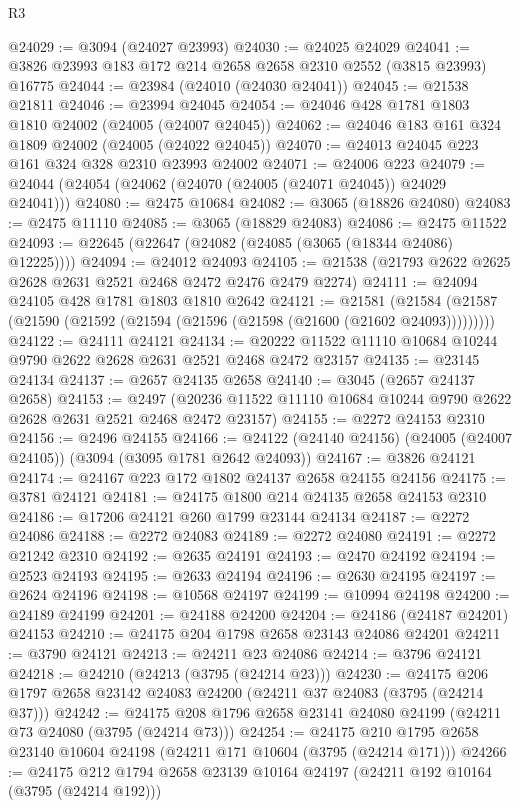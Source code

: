 \begin{lexlean}{R3}
\begin{coremodule}
@24029 := @3094 (@24027 @23993)
@24030 := @24025 @24029
@24041 := @3826 @23993 @183 @172 @214 @2658 @2658 @2310 @2552 (@3815 @23993) @16775
@24044 := @23984 (@24010 (@24030 @24041))
@24045 := @21538 @21811
@24046 := @23994 @24045
@24054 := @24046 @428 @1781 @1803 @1810 @24002 (@24005 (@24007 @24045))
@24062 := @24046 @183 @161 @324 @1809 @24002 (@24005 (@24022 @24045))
@24070 := @24013 @24045 @223 @161 @324 @328 @2310 @23993 @24002
@24071 := @24006 @223
@24079 := @24044 (@24054 (@24062 (@24070 (@24005 (@24071 @24045)) @24029 @24041)))
@24080 := @2475 @10684
@24082 := @3065 (@18826 @24080)
@24083 := @2475 @11110
@24085 := @3065 (@18829 @24083)
@24086 := @2475 @11522
@24093 := @22645 (@22647 (@24082 (@24085 (@3065 (@18344 @24086) @12225))))
@24094 := @24012 @24093
@24105 := @21538 (@21793 @2622 @2625 @2628 @2631 @2521 @2468 @2472 @2476 @2479 @2274)
@24111 := @24094 @24105 @428 @1781 @1803 @1810 @2642
@24121 := @21581
    (@21584 (@21587 (@21590 (@21592 (@21594 (@21596 (@21598 (@21600 (@21602 @24093)))))))))
@24122 := @24111 @24121
@24134 := @20222 @11522 @11110 @10684 @10244 @9790 @2622 @2628 @2631 @2521 @2468 @2472 @23157
@24135 := @23145 @24134
@24137 := @2657 @24135 @2658
@24140 := @3045 (@2657 @24137 @2658)
@24153 := @2497
    (@20236 @11522 @11110 @10684 @10244 @9790 @2622 @2628 @2631 @2521 @2468 @2472 @23157)
@24155 := @2272 @24153 @2310
@24156 := @2496 @24155
@24166 := @24122 (@24140 @24156) (@24005 (@24007 @24105)) (@3094 (@3095 @1781 @2642 @24093))
@24167 := @3826 @24121
@24174 := @24167 @223 @172 @1802 @24137 @2658 @24155 @24156
@24175 := @3781 @24121
@24181 := @24175 @1800 @214 @24135 @2658 @24153 @2310
@24186 := @17206 @24121 @260 @1799 @23144 @24134
@24187 := @2272 @24086
@24188 := @2272 @24083
@24189 := @2272 @24080
@24191 := @2272 @21242 @2310
@24192 := @2635 @24191
@24193 := @2470 @24192
@24194 := @2523 @24193
@24195 := @2633 @24194
@24196 := @2630 @24195
@24197 := @2624 @24196
@24198 := @10568 @24197
@24199 := @10994 @24198
@24200 := @24189 @24199
@24201 := @24188 @24200
@24204 := @24186 (@24187 @24201) @24153
@24210 := @24175 @204 @1798 @2658 @23143 @24086 @24201
@24211 := @3790 @24121
@24213 := @24211 @23 @24086
@24214 := @3796 @24121
@24218 := @24210 (@24213 (@3795 (@24214 @23)))
@24230 := @24175 @206 @1797 @2658 @23142 @24083 @24200 (@24211 @37 @24083 (@3795 (@24214 @37)))
@24242 := @24175 @208 @1796 @2658 @23141 @24080 @24199 (@24211 @73 @24080 (@3795 (@24214 @73)))
@24254 := @24175 @210 @1795 @2658 @23140 @10604 @24198 (@24211 @171 @10604 (@3795 (@24214 @171)))
@24266 := @24175 @212 @1794 @2658 @23139 @10164 @24197 (@24211 @192 @10164 (@3795 (@24214 @192)))

\end{coremodule}
\end{lexlean}
